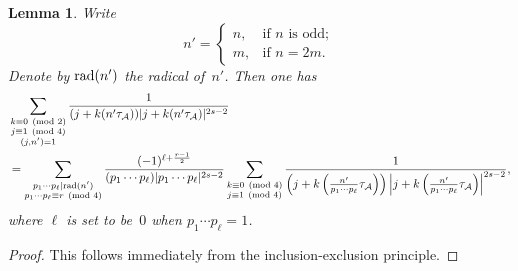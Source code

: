 \documentclass[11pt, reqno]{amsart}
\theoremstyle{plain}
\newtheorem{lemma}[theorem]{Lemma}
\theoremstyle{definition}
\numberwithin{equation}{section}
\begin{document}
\begin{lemma}\label{eisenstein1}
Write 
$$
n'=\begin{cases}
    n,&\mbox{if $n$ is odd};\\
    m,&\mbox{if $n=2m$.}
\end{cases}
$$
Denote by ${\rm rad}(n')$ the radical of~$n'$. Then one has
    \begin{align*}
        &\sum_{\substack{k\equiv0\pmod{2}\\j\equiv1\pmod{4}\\(j,n')=1}}\frac{1}{(j+k(n'\tau_{\mathcal{A}}))|j+k(n'\tau_{\mathcal{A}})|^{2s-2}}\\
        &=\sum_{\substack{p_{1}\cdots p_{\ell}|{\rm rad}(n')\\ p_{1}\cdots p_{\ell}\equiv r\pmod{4}}}\frac{(-1)^{\ell+\frac{r-1}{2}}}{(p_{1}\cdots p_{\ell})|p_{1}\cdots p_{\ell}|^{2s-2}}\sum_{\substack{k\equiv0\pmod{4}\\j\equiv1\pmod{4}}}\frac{1}{\left(j+k\left(\frac{n'}{p_{1}\cdots p_{\ell}}\tau_{\mathcal{A}}\right)\right)\left|j+k\left(\frac{n'}{p_{1}\cdots p_{\ell}}\tau_{\mathcal{A}}\right)\right|^{2s-2}},
    \end{align*}
    where $\ell$ is set to be~$0$ when $p_{1}\cdots p_{\ell}=1$.
\end{lemma}

\begin{proof}
    This follows immediately from the inclusion-exclusion principle.
\end{proof}
\end{document}
